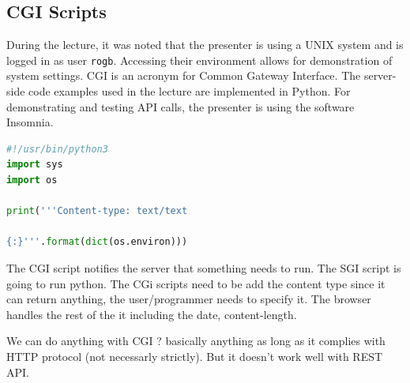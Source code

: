 \subsection{CGI Scripts}
During the lecture, it was noted that the presenter is using a UNIX system and is logged in as user \texttt{rogb}. Accessing their environment allows for demonstration of system settings.  CGI is an acronym for Common Gateway Interface. The server-side code examples used in the lecture are implemented in Python. For demonstrating and testing API calls, the presenter is using the software Insomnia.

\begin{lstlisting}[language=python,caption=CGI script]
#!/usr/bin/python3
import sys
import os 

print('''Content-type: text/text

{:}'''.format(dict(os.environ)))
\end{lstlisting}

\vspace{1em}

%    
\vspace{1em}

The CGI script notifies the server that something needs to run. The SGI script is going to run python.
The CGi scripts need to be add the content type since it can return anything, the user/programmer needs to specify it. The browser handles the rest of the it including the date, content-length.

We can do anything with CGI ? basically anything as long as it complies with HTTP protocol (not necessarly strictly). But it doesn't work well with REST API.

